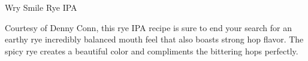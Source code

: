 \stylesection{\stylegermanwheatandryebeer}

\begin{recipie}{Wry Smile Rye IPA}

\begin{aboutblock}
Courtesy of Denny Conn, this rye IPA recipe is sure to end your search for
an earthy rye incredibly balanced mouth feel that also boasts strong hop flavor.
The spicy rye creates a beautiful color and compliments the bittering hops
perfectly. 
\end{aboutblock}


\begin{methodandtiming}

\begin{mashsteps}
\end{mashsteps}

\begin{fermentationsteps}
\end{fermentationsteps}

\end{methodandtiming}

\pagebreak

\begin{ingredientsblock}

\begin{malts}
\end{malts}

\begin{hops}
\end{hops}

\begin{yeasts}
\end{yeasts}

\end{ingredientsblock}

\end{recipie}